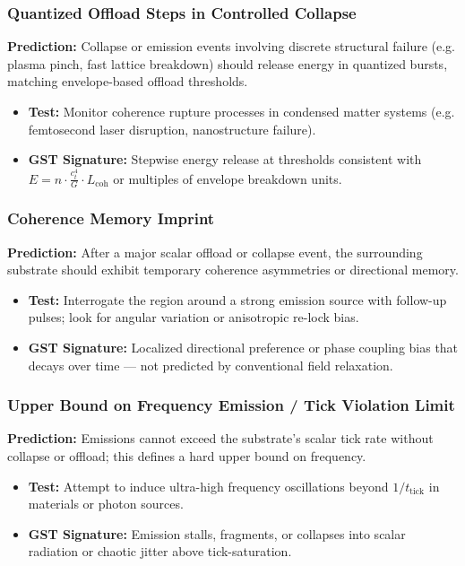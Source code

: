 \documentclass[entropy,article,submit,pdftex,moreauthors]{Definitions/mdpi}
\begin{document}
\subsubsection{Quantized Offload Steps in Controlled Collapse}

\textbf{Prediction:} Collapse or emission events involving discrete structural failure (e.g. plasma pinch, fast lattice breakdown) should release energy in quantized bursts, matching envelope-based offload thresholds.

\begin{itemize}
    \item \textbf{Test:} Monitor coherence rupture processes in condensed matter systems (e.g. femtosecond laser disruption, nanostructure failure).
    \item \textbf{GST Signature:} Stepwise energy release at thresholds consistent with \( E = n \cdot \frac{c_t^4}{G} \cdot L_{\text{coh}} \) or multiples of envelope breakdown units.
\end{itemize}

\subsubsection{Coherence Memory Imprint}

\textbf{Prediction:} After a major scalar offload or collapse event, the surrounding substrate should exhibit temporary coherence asymmetries or directional memory.

\begin{itemize}
    \item \textbf{Test:} Interrogate the region around a strong emission source with follow-up pulses; look for angular variation or anisotropic re-lock bias.
    \item \textbf{GST Signature:} Localized directional preference or phase coupling bias that decays over time — not predicted by conventional field relaxation.
\end{itemize}

\subsubsection{Upper Bound on Frequency Emission / Tick Violation Limit}

\textbf{Prediction:} Emissions cannot exceed the substrate's scalar tick rate without collapse or offload; this defines a hard upper bound on frequency.

\begin{itemize}
    \item \textbf{Test:} Attempt to induce ultra-high frequency oscillations beyond \( 1 / t_{\text{tick}} \) in materials or photon sources.
    \item \textbf{GST Signature:} Emission stalls, fragments, or collapses into scalar radiation or chaotic jitter above tick-saturation.
\end{itemize}
\end{document}
